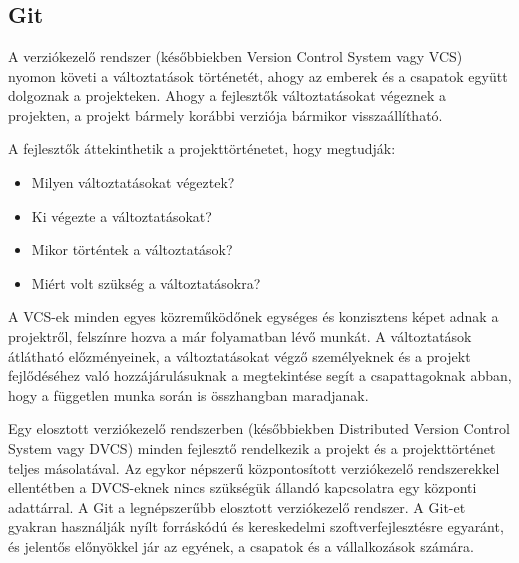 \chapter{\github}
\section{Git}
A verziókezelő rendszer (későbbiekben Version Control System vagy VCS) nyomon követi a változtatások történetét, ahogy az emberek és a csapatok együtt dolgoznak a projekteken. Ahogy a fejlesztők változtatásokat végeznek a projekten, a projekt bármely korábbi verziója bármikor visszaállítható.

A fejlesztők áttekinthetik a projekttörténetet, hogy megtudják:
\begin{itemize}
  \item Milyen változtatásokat végeztek?
  \item Ki végezte a változtatásokat?
  \item Mikor történtek a változtatások?
  \item Miért volt szükség a változtatásokra?
\end{itemize}

A VCS-ek minden egyes közreműködőnek egységes és konzisztens képet adnak a projektről, felszínre hozva a már folyamatban lévő munkát. A változtatások átlátható előzményeinek, a változtatásokat végző személyeknek és a projekt fejlődéséhez való hozzájárulásuknak a megtekintése segít a csapattagoknak abban, hogy a független munka során is összhangban maradjanak.

Egy elosztott verziókezelő rendszerben (későbbiekben Distributed Version Control System vagy DVCS) minden fejlesztő rendelkezik a projekt és a projekttörténet teljes másolatával. Az egykor népszerű központosított verziókezelő rendszerekkel ellentétben a DVCS-eknek nincs szükségük állandó kapcsolatra egy központi adattárral. A Git a legnépszerűbb elosztott verziókezelő rendszer. A Git-et gyakran használják nyílt forráskódú és kereskedelmi szoftverfejlesztésre egyaránt, és jelentős előnyökkel jár az egyének, a csapatok és a vállalkozások számára.

